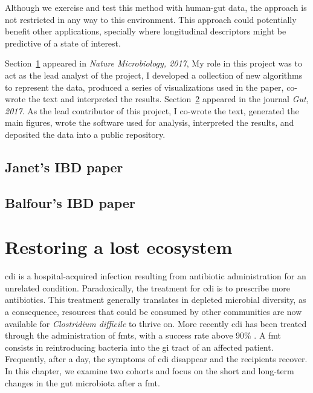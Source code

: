 \documentclass[12pt,chapterheads]{ucsd}
\begin{document}
Although we exercise and test this method with human-gut data, the approach is 
not restricted in any way to this environment. This approach could potentially 
benefit other applications, specially where longitudinal descriptors might be 
predictive of a state of interest.

Section~\ref{plane} appeared in \textsl{Nature Microbiology, 2017}, My role in 
this project was to act as the lead analyst of the project, I developed a 
collection of new algorithms to represent the data, produced a series of 
visualizations used in the paper, co-wrote the text and interpreted the 
results. Section~\ref{ibd} appeared in the journal \textsl{Gut, 2017}. As the 
lead contributor of this project, I co-wrote the text, generated the main 
figures, wrote the software used for analysis, interpreted the results, and 
deposited the data into a public repository.

\ifdefined\RELEASE
    
    
\else
    \section{Janet's IBD paper}\label{plane}
    \section{Balfour's IBD paper}\label{ibd}
\fi

\chapter{Restoring a lost ecosystem}\label{chapter_fmts}
\glsresetall

\gls{cdi} is a hospital-acquired infection resulting from antibiotic 
administration for an unrelated condition. Paradoxically, the treatment for 
\gls{cdi} is to prescribe more antibiotics. This treatment generally translates 
in depleted microbial diversity, as a consequence, resources that could be 
consumed by other communities are now available for \textit{Clostridium 
difficile} to thrive on.  More recently \gls{cdi} has been treated through the 
administration of \glspl{fmt}, with a success rate above 90\% \cite{RN4129}. A 
\gls{fmt} consists in reintroducing bacteria into the \gls{gi} tract of an 
affected patient. Frequently, after a day, the symptoms of \gls{cdi} disappear 
and the recipients recover. In this chapter, we examine two cohorts and focus 
on the short and long-term changes in the gut microbiota after a \gls{fmt}.
\end{document}
